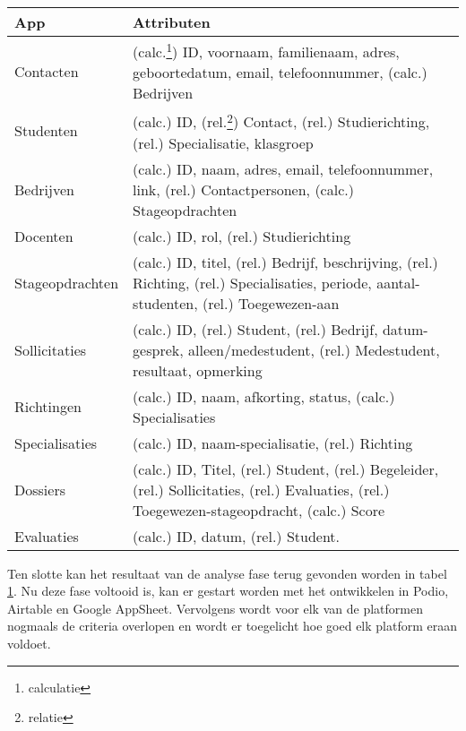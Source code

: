 \begin{table}
    \centering
    \caption{\label{tab:Resultaat analyse} }
    \begin{tabular}{ | p{4cm} | p{8cm} | }
        \hline
        \textbf{App} & \textbf{Attributen} \\
        \hline\hline
        Contacten       & (calc.\footnote{calculatie}) ID, voornaam, familienaam, adres, geboortedatum, email, telefoonnummer, (calc.) Bedrijven \\
        Studenten       & (calc.) ID, (rel.\footnote{relatie}) Contact, (rel.) Studierichting, (rel.)  Specialisatie, klasgroep \\
        Bedrijven       & (calc.) ID, naam, adres, email, telefoonnummer, link, (rel.) Contactpersonen, (calc.) Stageopdrachten \\
        Docenten        & (calc.) ID, rol, (rel.) Studierichting \\
        Stageopdrachten & (calc.) ID, titel, (rel.) Bedrijf, beschrijving, (rel.) Richting, (rel.) Specialisaties, periode, aantal-studenten, (rel.) Toegewezen-aan \\
        Sollicitaties   & (calc.) ID, (rel.) Student, (rel.) Bedrijf, datum-gesprek, alleen/medestudent, (rel.) Medestudent, resultaat, opmerking \\
        Richtingen      & (calc.) ID, naam, afkorting, status, (calc.) Specialisaties \\
        Specialisaties  & (calc.) ID, naam-specialisatie, (rel.) Richting \\
        Dossiers        & (calc.) ID, Titel, (rel.) Student, (rel.) Begeleider, (rel.) Sollicitaties, (rel.) Evaluaties, (rel.) Toegewezen-stageopdracht, (calc.) Score \\
        Evaluaties      & (calc.) ID, datum, (rel.) Student. \\
        \hline
    \end{tabular}
\end{table}

Ten slotte kan het resultaat van de analyse fase terug gevonden worden in tabel \ref{tab:Resultaat analyse}. Nu deze fase voltooid is, kan er gestart worden met het ontwikkelen in Podio, Airtable en Google AppSheet. Vervolgens wordt voor elk van de platformen nogmaals de criteria overlopen en wordt er toegelicht hoe goed elk platform eraan voldoet. \\

\newpage



